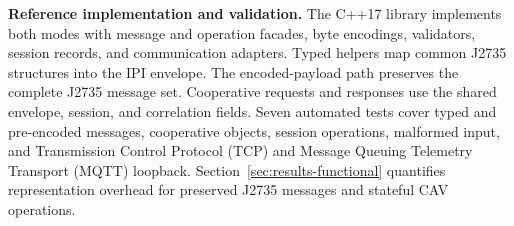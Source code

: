 \textbf{Reference implementation and validation.}
The C++17 library implements both modes with message and operation facades,
byte encodings, validators, session records, and communication adapters. Typed helpers map
common J2735 structures into the IPI envelope. The encoded-payload path
preserves the complete J2735 message set. Cooperative requests and responses
use the shared envelope, session, and correlation fields. Seven automated tests cover
typed and pre-encoded messages, cooperative objects, session operations,
malformed input, and Transmission Control Protocol (TCP) and Message Queuing
Telemetry Transport (MQTT) loopback. Section~\ref{sec:results-functional}
quantifies representation overhead for preserved J2735 messages and stateful
CAV operations.
